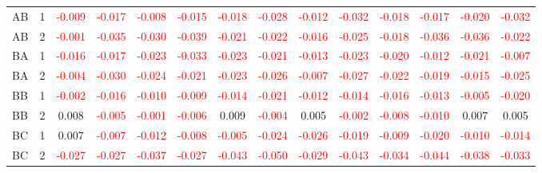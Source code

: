 \begin{table}[H]
{\begin{tabular}{llcccccccccccc}
AB & 1 & \textcolor{red}{-0.009} & \textcolor{red}{-0.017} & \textcolor{red}{-0.008} & \textcolor{red}{-0.015} & \textcolor{red}{-0.018} & \textcolor{red}{-0.028} & \textcolor{red}{-0.012} & \textcolor{red}{-0.032} & \textcolor{red}{-0.018} & \textcolor{red}{-0.017} & \textcolor{red}{-0.020} & \textcolor{red}{-0.032}\\
AB & 2 & \textcolor{red}{-0.001} & \textcolor{red}{-0.035} & \textcolor{red}{-0.030} & \textcolor{red}{-0.039} & \textcolor{red}{-0.021} & \textcolor{red}{-0.022} & \textcolor{red}{-0.016} & \textcolor{red}{-0.025} & \textcolor{red}{-0.018} & \textcolor{red}{-0.036} & \textcolor{red}{-0.036} & \textcolor{red}{-0.022}\\
BA & 1 & \textcolor{red}{-0.016} & \textcolor{red}{-0.017} & \textcolor{red}{-0.023} & \textcolor{red}{-0.033} & \textcolor{red}{-0.023} & \textcolor{red}{-0.021} & \textcolor{red}{-0.013} & \textcolor{red}{-0.023} & \textcolor{red}{-0.020} & \textcolor{red}{-0.012} & \textcolor{red}{-0.021} & \textcolor{red}{-0.007}\\
BA & 2 & \textcolor{red}{-0.004} & \textcolor{red}{-0.030} & \textcolor{red}{-0.024} & \textcolor{red}{-0.021} & \textcolor{red}{-0.023} & \textcolor{red}{-0.026} & \textcolor{red}{-0.007} & \textcolor{red}{-0.027} & \textcolor{red}{-0.022} & \textcolor{red}{-0.019} & \textcolor{red}{-0.015} & \textcolor{red}{-0.025}\\
BB & 1 & \textcolor{red}{-0.002} & \textcolor{red}{-0.016} & \textcolor{red}{-0.010} & \textcolor{red}{-0.009} & \textcolor{red}{-0.014} & \textcolor{red}{-0.021} & \textcolor{red}{-0.012} & \textcolor{red}{-0.014} & \textcolor{red}{-0.016} & \textcolor{red}{-0.013} & \textcolor{red}{-0.005} & \textcolor{red}{-0.020}\\
BB & 2 & 0.008 & \textcolor{red}{-0.005} & \textcolor{red}{-0.001} & \textcolor{red}{-0.006} & 0.009 & \textcolor{red}{-0.004} & 0.005 & \textcolor{red}{-0.002} & \textcolor{red}{-0.008} & \textcolor{red}{-0.010} & 0.007 & 0.005\\
BC & 1 & 0.007 & \textcolor{red}{-0.007} & \textcolor{red}{-0.012} & \textcolor{red}{-0.008} & \textcolor{red}{-0.005} & \textcolor{red}{-0.024} & \textcolor{red}{-0.026} & \textcolor{red}{-0.019} & \textcolor{red}{-0.009} & \textcolor{red}{-0.020} & \textcolor{red}{-0.010} & \textcolor{red}{-0.014}\\
BC & 2 & \textcolor{red}{-0.027} & \textcolor{red}{-0.027} & \textcolor{red}{-0.037} & \textcolor{red}{-0.027} & \textcolor{red}{-0.043} & \textcolor{red}{-0.050} & \textcolor{red}{-0.029} & \textcolor{red}{-0.043} & \textcolor{red}{-0.034} & \textcolor{red}{-0.044} & \textcolor{red}{-0.038} & \textcolor{red}{-0.033}\\

\end{tabular}}
\end{table}
